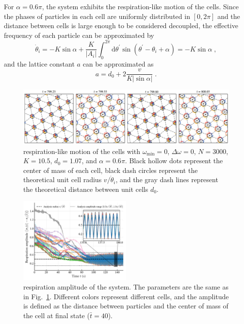 \documentclass{article}
\begin{document}
For $\alpha=0.6\pi$, the system exhibits the respiration-like motion of the cells. Since the phases of particles in each cell are uniformly distributed in $[0, 2\pi]$ and the distance between cells is large enough to be considered decoupled, the effective frequency of each particle can be approximated by
\begin{equation}
    \dot{\theta}_i=-K\sin \alpha +\frac{K}{\left| A_i \right|}\int_0^{2\pi}{\mathrm{d}\theta ^{\prime}\sin \left( \theta ^{\prime}-\theta _i+\alpha \right)}=-K\sin \alpha\;,
\end{equation}
and the lattice constant $a$ can be approximated as 
\begin{equation}
    a=d_0+2\frac{v}{K\left| \sin \alpha \right|}\;.
    \label{eq:latticeConstant}
\end{equation}
\begin{figure}[H]
    \centering
    \includegraphics[width=\textwidth]{./figs/respiration_snapshot.pdf}
    \caption{
        \label{fig:respiration_snapshot}
        respiration-like motion of the cells with $\omega _{\min}=0$, $\Delta \omega=0$, $N=3000$, $K=10.5$, $d_0=1.07$, and $\alpha=0.6\pi$. Black hollow dots represent the center of mass of each cell, black dash circles represent the theoretical unit cell radius $v/\dot{\theta}_i$, and the gray dash lines represent the theoretical distance between unit cells $d_0$.
    }
\end{figure}
\begin{figure}[H]
    \centering
    \includegraphics[width=0.5\textwidth]{./figs/respiration_amplitude_inset.pdf}
    \caption{
        \label{fig:respiration_amplitude}
        respiration amplitude of the system. 
        The parameters are the same as in Fig.~\ref{fig:respiration_snapshot}.
        Different colors represent different cells, and the amplitude is defined as the distance between particles and the center of mass of the cell at final state ($\bar{t}=40$).
    }
\end{figure}
\end{document}
